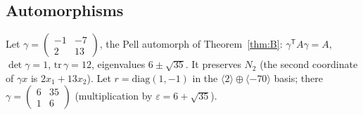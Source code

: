 \subsection{Automorphisms}\label{sec:rev8aut}
Let $\gamma=\left(\begin{smallmatrix}-1&-7\\2&13\end{smallmatrix}\right)$, the Pell automorph of Theorem~\ref{thm:B}: $\gamma^{\mathsf T}A\gamma=A$, $\det\gamma=1$, $\mathrm{tr}\,\gamma=12$, eigenvalues $6\pm\sqrt{35}$. It preserves $N_2$ (the second coordinate of $\gamma x$ is $2x_1+13x_2$). Let $r=\mathrm{diag}(1,-1)$ in the $\langle2\rangle\oplus\langle-70\rangle$ basis; there $\gamma=\left(\begin{smallmatrix}6&35\\1&6\end{smallmatrix}\right)$ (multiplication by $\varepsilon=6+\sqrt{35}$).

